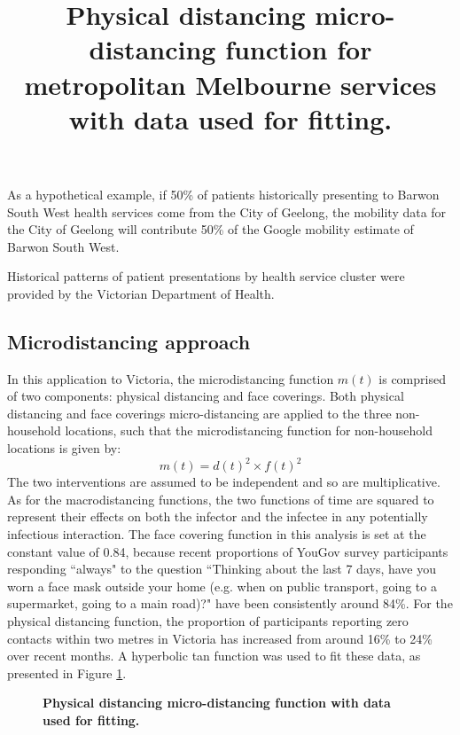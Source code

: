 As a hypothetical example, if 50\% of patients historically presenting to Barwon South West health services come from the City of Geelong, the mobility data for the City of Geelong will contribute 50\% of the Google mobility estimate of Barwon South West.

Historical patterns of patient presentations by health service cluster were provided by the Victorian Department of Health.

\subsection{Microdistancing approach}
In this application to Victoria, the microdistancing function \(m(t)\) is comprised of two components: physical distancing and face coverings. Both physical distancing and face coverings micro-distancing are applied to the three non-household locations, such that the microdistancing function for non-household locations is given by: \[m(t)=d(t)^2\times f(t)^2\]
The two interventions are assumed to be independent and so are multiplicative. As for the macrodistancing functions, the two functions of time are squared to represent their effects on both the infector and the infectee in any potentially infectious interaction.
The face covering function in this analysis is set at the constant value of 0.84, because recent proportions of YouGov survey participants responding ``always" to the question ``Thinking about the last 7 days, have you worn a face mask outside your home (e.g. when on public transport, going to a supermarket, going to a main road)?" have been consistently around 84\%.
For the physical distancing function, the proportion of participants reporting zero contacts within two metres in Victoria has increased from around 16\% to 24\% over recent months. A hyperbolic tan function was used to fit these data, as presented in Figure \ref{fig:micro_physical}.

\begin{figure}[ht]
    \caption{\textbf{Physical distancing micro-distancing function with data used for fitting.}}
	\label{fig:micro_physical}
	\title{Physical distancing micro-distancing function for metropolitan Melbourne services with data used for fitting.}
\end{figure}
